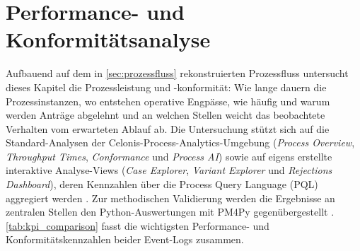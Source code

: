 \section{Performance- und Konformitätsanalyse}
\label{sec:performance}

Aufbauend auf dem in \autoref{sec:prozessfluss} rekonstruierten Prozessfluss untersucht dieses Kapitel die Prozessleistung und -konformität:
Wie lange dauern die Prozessinstanzen, wo entstehen operative Engpässe, wie häufig und warum werden Anträge abgelehnt und an welchen Stellen
weicht das beobachtete Verhalten vom erwarteten Ablauf ab. Die Untersuchung stützt sich auf die Standard-Analysen
der Celonis-Process-Analytics-Umgebung (\textit{Process Overview}, \textit{Throughput Times}, \textit{Conformance} und \textit{Process AI})
sowie auf eigens erstellte interaktive Analyse-Views (\textit{Case Explorer}, \textit{Variant Explorer} und \textit{Rejections Dashboard}),
deren Kennzahlen über die Process Query Language (PQL) aggregiert werden \parencite{vogelgesang_celonis_2022}. Zur methodischen Validierung
werden die Ergebnisse an zentralen Stellen den Python-Auswertungen mit PM4Py gegenübergestellt \parencite{berti_process_2019}. \autoref{tab:kpi_comparison}
fasst die wichtigsten Performance- und Konformitätskennzahlen beider Event-Logs zusammen.

